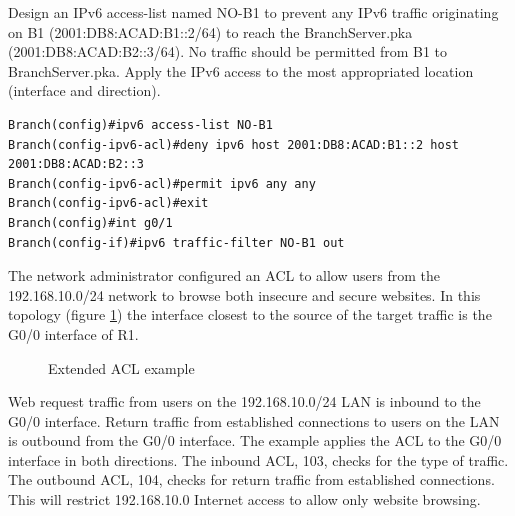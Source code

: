 \begin{example}
 Design an IPv6 access-list named NO-B1 to prevent any IPv6 traffic originating on B1 (2001:DB8:ACAD:B1::2/64) to reach the BranchServer.pka (2001:DB8:ACAD:B2::3/64). No traffic should be permitted from B1 to BranchServer.pka. Apply the IPv6 access to the most appropriated location (interface and direction).
\begin{verbatim}
Branch(config)#ipv6 access-list NO-B1
Branch(config-ipv6-acl)#deny ipv6 host 2001:DB8:ACAD:B1::2 host 2001:DB8:ACAD:B2::3
Branch(config-ipv6-acl)#permit ipv6 any any
Branch(config-ipv6-acl)#exit
Branch(config)#int g0/1
Branch(config-if)#ipv6 traffic-filter NO-B1 out
\end{verbatim}
\end{example}
\begin{example}
The network administrator configured an ACL to allow users from the 192.168.10.0/24 network to browse both insecure and secure websites. In this topology (figure \ref{example4}) the interface closest to the source of the target traffic is the G0/0 interface of R1.
	\begin{figure}[hbtp]
	\caption{Extended ACL example}\label{example4}
	\centering
	\end{figure}
Web request traffic from users on the 192.168.10.0/24 LAN is inbound to the G0/0 interface. Return traffic from established connections to users on the LAN is outbound from the G0/0 interface. The example applies the ACL to the G0/0 interface in both directions. The inbound ACL, 103, checks for the type of traffic. The outbound ACL, 104, checks for return traffic from established connections. This will restrict 192.168.10.0 Internet access to allow only website browsing.
\end{example}
